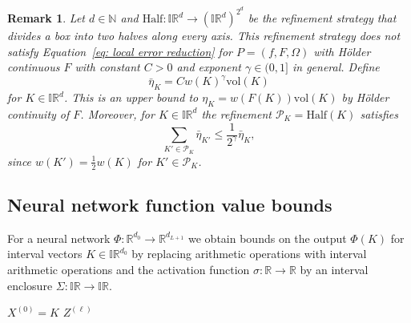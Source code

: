 \documentclass[a4paper, 11pt]{article}
\newtheorem{remark}[theorem]{Remark}
\newcommand{\vol}{\mathrm{vol}}
\begin{document}
	\begin{remark}\label{rem:HalfRefinement}
		Let $d\in \mathbb{N}$ and $\mathrm{Half}:\mathbb{IR}^d \to (\mathbb{IR}^d)^{2^d}$ be the refinement strategy that divides a box into two halves along every axis. This refinement strategy does not satisfy Equation~\eqref{eq: local error reduction} for $P=(f,F,\Omega)$ with Hölder continuous $F$ with constant $C>0$ and exponent $\gamma \in (0,1]$ in general. Define
		\begin{equation}
			\bar{\eta}_K = Cw(K)^\gamma \vol(K)
		\end{equation}
		for $K\in \mathbb{IR}^d$. This is an upper bound to $\eta_K = w(F(K))\vol(K)$
		by Hölder continuity of $F$. Moreover, for $K\in \mathbb{IR}^d$ the refinement $\mathcal{P}_K = \mathrm{Half}(K)$ satisfies
		\begin{equation}
			\sum_{K' \in \mathcal{P}_K} \bar{\eta}_{K'} \leq \frac{1}{2^\gamma} \bar{\eta}_K,
		\end{equation}
		since $w(K')=\tfrac{1}{2}w(K)$ for $K' \in \mathcal{P}_K$.
	\end{remark}
	
	
	
	
	
	
	\subsection{Neural network function value bounds}\label{subsec:functionValues}
	
	
	For a neural network $\Phi: \mathbb{R}^{d_0} \to \mathbb{R}^{d_{L+1}}$ we obtain bounds on the output $\Phi(K)$ for interval vectors $K\in \mathbb{IR}^{d_0}$ by replacing arithmetic operations with interval arithmetic operations and the activation function $\sigma:\mathbb{R} \to \mathbb{R}$ by an interval enclosure $\Sigma : \mathbb{IR} \to \mathbb{IR}$.
	
	\vspace{1em}
	\begin{algorithm}[H]\label{alg: nn fval bounds}
		\LinesNotNumbered
		\DontPrintSemicolon
		\caption{$\mathrm{Fval_{\Phi,\ell,\Sigma}}(K)$}
		\vspace{1em}
		${X}^{(0)} = K$\;
		\Return $Z^{(\ell)}$\;
	\end{algorithm}
	\vspace{1em}
	
\end{document}
